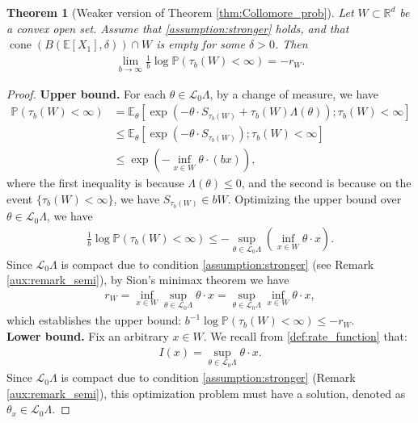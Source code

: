 \documentclass[aap,preprint]{imsart}
\newcommand{\Pro}{{\mathbb{P}}}
\newcommand{\Exp}{{\mathbb{E}}}
\theoremstyle{plain}
\newtheorem{theorem}{Theorem}[section]
\theoremstyle{definition}
\begin{document}
\begin{appendix}
\begin{theorem}[Weaker version of Theorem \ref{thm:Collomore_prob}]\label{app:thrm_weaker_prob}
    Let $W \subset \mathbb{R}^d$ be a convex open set. 
 Assume  that \eqref{assumption:stronger} holds, and that 
$\operatorname{cone}(B(\Exp[X_1], \delta)) \cap W$ is empty for some $\delta > 0$.  Then  
\begin{align*}
\lim_{b \to \infty}    \frac{1}{b} \log \Pro(\tau_b(W) < \infty)  =- r_W.
\end{align*}
\end{theorem}
\begin{proof}
\noindent \textbf{Upper bound.} For each $\theta \in \mathcal{L}_0\Lambda$, by a change of measure, we have
\begin{align*}
 \Pro(\tau_b(W) < \infty) &= \Exp_{\theta}\left[\exp(- \theta \cdot S_{\tau_b(W)} + \tau_b(W) \Lambda(\theta) ); \tau_b(W) < \infty \right]  \\
& \leq \Exp_{\theta}\left[\exp(- \theta \cdot S_{\tau_b(W)}  ); \tau_b(W) < \infty \right] \\
&\leq \exp(- \inf_{x \in W}  \theta \cdot (bx)  ),
\end{align*}
where the first inequality is because $\Lambda(\theta) \leq 0$, and the second is because on the event $\{\tau_b(W) < \infty\}$, we have $S_{\tau_b(W)} \in bW$.  
Optimizing the upper bound over $\theta \in \mathcal{L}_0\Lambda$,   we have
\begin{align*}
   \frac{1}{b} \log \Pro(\tau_b(W) < \infty) \leq - \sup_{\theta \in \mathcal{L}_0\Lambda} (\inf_{x \in W} \theta \cdot x).
\end{align*}
Since $\mathcal{L}_0 \Lambda$ is compact due to condition \eqref{assumption:stronger} (see Remark \ref{aux:remark_semi}),  by Sion's minimax theorem \citep{sion1958minimax}  we have
\begin{align*}
    r_W = \inf_{x \in W} \sup_{\theta \in \mathcal{L}_0\Lambda} \theta \cdot x =  \sup_{\theta \in \mathcal{L}_0\Lambda} \inf_{x \in W} \theta \cdot x,
\end{align*}
which establishes the upper bound: $b^{-1} \log \Pro(\tau_b(W) < \infty) \leq -r_W$.\\

\noindent \textbf{Lower bound.} Fix an arbitrary $x \in W$. We recall from \eqref{def:rate_function} that:
\begin{align*}
  I(x)=  \sup_{\theta \in \mathcal{L}_0\Lambda} \theta \cdot x.
\end{align*}
Since  $\mathcal{L}_0\Lambda$ is compact due to condition \eqref{assumption:stronger} (Remark \ref{aux:remark_semi}),
this optimization problem 
must have a solution, denoted as $\theta_x \in \mathcal{L}_0\Lambda$.


\end{proof}
\end{appendix}
\end{document}
